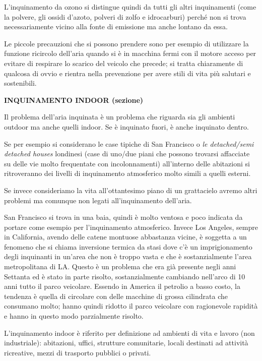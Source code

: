 \documentclass[]{article}
\begin{document}
L'inquinamento da ozono si distingue quindi da tutti gli altri
inquinamenti (come la polvere, gli ossidi d'azoto, polveri di zolfo e
idrocarburi) perché non si trova necessariamente vicino alla fonte di
emissione ma anche lontano da essa.

Le piccole precauzioni che si possono prendere sono per esempio di
utilizzare la funzione ricircolo dell'aria quando si è in macchina fermi
con il motore acceso per evitare di respirare lo scarico del veicolo che
precede; si tratta chiaramente di qualcosa di ovvio e rientra nella
prevenzione per avere stili di vita più salutari e sostenibili.

\textbf{INQUINAMENTO INDOOR (sezione)}

Il problema dell'aria inquinata è un problema che riguarda sia gli
ambienti outdoor ma anche quelli indoor. Se è inquinato fuori, è anche
inquinato dentro.

Se per esempio si considerano le case tipiche di San Francisco o
\emph{le detached/semi detached houses} londinesi (case di uno/due piani
che possono trovarsi affacciate su delle vie molto frequentate con
incolonnamenti) all'interno delle abitazioni si ritroveranno dei livelli
di inquinamento atmosferico molto simili a quelli esterni.

Se invece consideriamo la vita all'ottantesimo piano di un grattacielo
avremo altri problemi ma comunque non legati all'inquinamento dell'aria.

San Francisco si trova in una baia, quindi è molto ventosa e poco
indicata da portare come esempio per l'inquinamento atmosferico. Invece
Los Angeles, sempre in California, avendo delle catene montuose
abbastanza vicine, è soggetta a un fenomeno che si chiama inversione
termica da stasi dove c'è un imprigionamento degli inquinanti in un'area
che non è troppo vasta e che è sostanzialmente l'area metropolitana di
LA. Questo è un problema che era già presente negli anni Settanta ed è
stato in parte risolto, sostanzialmente cambiando nell'arco di 10 anni
tutto il parco veicolare. Essendo in America il petrolio a basso costo,
la tendenza è quella di circolare con delle macchine di grossa
cilindrata che consumano molto; hanno quindi ridotto il parco veicolare
con ragionevole rapidità e hanno in questo modo parzialmente risolto.

L'inquinamento indoor è riferito per definizione ad ambienti di vita e
lavoro (non industriale): abitazioni, uffici, strutture comunitarie,
locali destinati ad attività ricreative, mezzi di trasporto pubblici o
privati.
\end{document}
